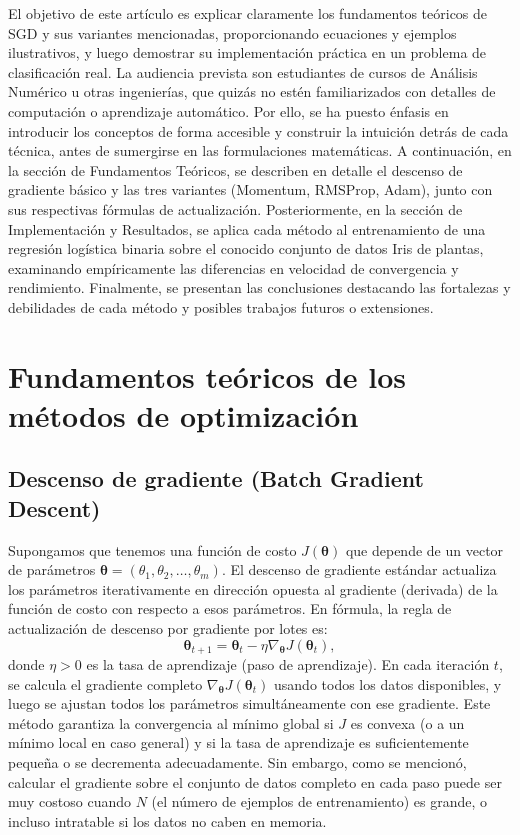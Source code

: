 \documentclass[12pt, spanish]{article}
\begin{document}
El objetivo de este artículo es explicar claramente los fundamentos teóricos de SGD y sus variantes mencionadas, proporcionando ecuaciones y ejemplos ilustrativos, y luego demostrar su implementación práctica en un problema de clasificación real. La audiencia prevista son estudiantes de cursos de Análisis Numérico u otras ingenierías, que quizás no estén familiarizados con detalles de computación o aprendizaje automático. Por ello, se ha puesto énfasis en introducir los conceptos de forma accesible y construir la intuición detrás de cada técnica, antes de sumergirse en las formulaciones matemáticas. A continuación, en la sección de Fundamentos Teóricos, se describen en detalle el descenso de gradiente básico y las tres variantes (Momentum, RMSProp, Adam), junto con sus respectivas fórmulas de actualización. Posteriormente, en la sección de Implementación y Resultados, se aplica cada método al entrenamiento de una regresión logística binaria sobre el conocido conjunto de datos Iris de plantas, examinando empíricamente las diferencias en velocidad de convergencia y rendimiento. Finalmente, se presentan las conclusiones destacando las fortalezas y debilidades de cada método y posibles trabajos futuros o extensiones.

\section{Fundamentos teóricos de los métodos de optimización}
\subsection{Descenso de gradiente (Batch Gradient Descent)}
Supongamos que tenemos una función de costo $J(\boldsymbol{\theta})$ que depende de un vector de parámetros $\boldsymbol{\theta} = (\theta_1, \theta_2, \ldots, \theta_m)$. El descenso de gradiente estándar actualiza los parámetros iterativamente en dirección opuesta al gradiente (derivada) de la función de costo con respecto a esos parámetros. En fórmula, la regla de actualización de descenso por gradiente por lotes es:
\[
\boldsymbol{\theta}_{t+1} = \boldsymbol{\theta}_t - \eta \nabla_{\boldsymbol{\theta}} J(\boldsymbol{\theta}_t),
\]
donde $\eta > 0$ es la tasa de aprendizaje (paso de aprendizaje). En cada iteración $t$, se calcula el gradiente completo $\nabla_{\boldsymbol{\theta}} J(\boldsymbol{\theta}_t)$ usando todos los datos disponibles, y luego se ajustan todos los parámetros simultáneamente con ese gradiente. Este método garantiza la convergencia al mínimo global si $J$ es convexa (o a un mínimo local en caso general) y si la tasa de aprendizaje es suficientemente pequeña o se decrementa adecuadamente. Sin embargo, como se mencionó, calcular el gradiente sobre el conjunto de datos completo en cada paso puede ser muy costoso cuando $N$ (el número de ejemplos de entrenamiento) es grande, o incluso intratable si los datos no caben en memoria.
\end{document}

